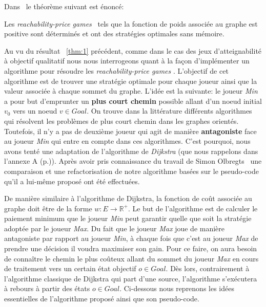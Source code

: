 


Dans~\cite{DBLP:conf/lfcs/BrihayePS13} le théorème suivant est énoncé:

\begin{thm}
	\label{thm:1}
	Les \og\textit{reachability-price games}\fg~ tels que la fonction de poids associée au graphe est positive sont déterminés et ont des stratégies optimales sans mémoire.
\end{thm}


Au vu du résultat ~\ref{thm:1} précédent, comme dans le cas des jeux d'atteignabilité à objectif qualitatif nous nous interrogeons quant à la façon d'implémenter un algorithme pour résoudre les \og \textit{reachability-price games} \fg. L'objectif de cet algorithme est de trouver une stratégie optimale pour chaque joueur ainsi que la valeur associée à chaque sommet du graphe. L'idée est la suivante: le joueur \textit{Min} a pour but d'emprunter un \textbf{plus court chemin} possible allant d'un noeud initial $v_{0}$ vers un noeud $v \in Goal$. On trouve dans la littérature différents algorithmes qui résolvent les problèmes de plus court chemin dans les graphes orientés. Toutefois, il n'y a pas de deuxième joueur qui agit de manière \textbf{antagoniste} face au joueur \textit{Min} qui entre en compte dans ces algorithmes. C'est pourquoi, nous avons tenté une adaptation de l'algorithme de \textit{Dijkstra} (que nous rappelons dans l'annexe A (p.\pageref{algo:dijkstra})). Après avoir pris connaissance du travail de Simon Olbregts~\cite{simon} une comparaison et une refactorisation de notre algorithme basées sur le pseudo-code qu'il a lui-même proposé ont été effectuées.

De manière similaire à l'algorithme de Dijkstra, la fonction de coût associée au graphe doit être de la forme $w : E \rightarrow \mathbb{R}^{+}$. Le but de l'algorithme est de calculer le paiement minimum que le joueur \textit{Min} peut garantir quelle que soit la stratégie adoptée par le joueur \textit{Max}. Du fait que le joueur \textit{Max} joue de manière antagoniste par rapport au joueur \textit{Min}, à chaque fois que c'est au joueur \textit{Max} de prendre une décision il voudra maximiser son gain. Pour ce faire, on aura besoin de connaître le chemin le plus coûteux allant du sommet du joueur \textit{Max} en cours de traitement vers un certain état objectif $o \in Goal$. Dès lors, contrairement à l'algorithme classique de Dijkstra qui part d'une source, l'algorithme s'exécutera à rebours à partir des états $o \in Goal$. Ci-dessous nous reprenons les idées essentielles de l'algorithme proposé ainsi que son pseudo-code.\\


